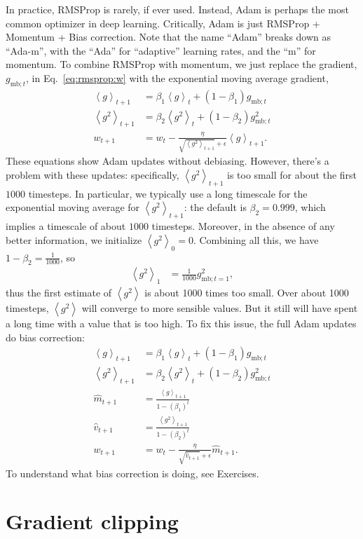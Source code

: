 \documentclass{article}
\newcommand{\bracket}[3]{\left#1 #3 \right#2}
\newcommand{\ab}{\bracket{\langle}{\rangle}}
\newcommand{\0}{\mathbf{0}}
\newcommand{\gsmbt}{g_{\text{mb}; t}}
\newcommand{\vh}{\hat{v}}
\newcommand{\mh}{\hat{m}}
\newcommand{\gssqb}{\ab{g^2}}
\newcommand{\gsb}{\ab{g}}
\begin{document}
In practice, RMSProp is rarely, if ever used.
Instead, Adam is perhaps the most common optimizer in deep learning.
Critically, Adam is just RMSProp + Momentum + Bias correction.
Note that the name ``Adam'' breaks down as ``Ada-m'', with the ``Ada'' for ``adaptive'' learning rates, and the ``m'' for momentum.
To combine RMSProp with momentum, we just replace the gradient, $\gsmbt$, in Eq.~\eqref{eq:rmsprop:w} with the exponential moving average gradient, 
\begin{align}
  \gsb_{t+1} &= \beta_1 \gsb_{t} + (1-\beta_1) \gsmbt\\
  \gssqb_{t+1} &= \beta_2 \gssqb_{t} + (1-\beta_2) \gsmbt^2\\
  w_{t+1} &= w_t - \frac{\eta}{\sqrt{\gssqb_{t+1}} + \epsilon}\gsb_{t+1}.
\end{align}
These equations show Adam updates without debiasing.
However, there's a problem with these updates: specifically, $\gssqb_{t+1}$ is too small for about the first $1000$ timesteps.
In particular, we typically use a long timescale for the exponential moving average for $\gssqb_{t+1}$: the default is $\beta_2 = 0.999$, which implies a timescale of about $1000$ timesteps.
Moreover, in the absence of any better information, we initialize $\gssqb_0 = 0$.
Combining all this, we have $1-\beta_2 = \tfrac{1}{1000}$, so
\begin{align}
  \gssqb_1 &= \tfrac{1}{1000} g_{\text{mb}; t=1}^2,
\end{align}
thus the first estimate of $\gssqb$ is about 1000 times too small.
Over about 1000 timesteps, $\gssqb$ will converge to more sensible values.
But it still will have spent a long time with a value that is too high.
To fix this issue, the full Adam updates do bias correction:
\begin{align}
  \gsb_{t+1} &= \beta_1 \gsb_{t} + (1-\beta_1) \gsmbt\\
  \gssqb_{t+1} &= \beta_2 \gssqb_{t} + (1-\beta_2) \gsmbt^2\\
  \mh_{t+1} &= \frac{\gsb_{t+1}}{1-(\beta_1)^t}\\
  \vh_{t+1} &= \frac{\gssqb_{t+1}}{1-(\beta_2)^t}\\
  w_{t+1} &= w_t - \frac{\eta}{\sqrt{\vh_{t+1}} + \epsilon}\mh_{t+1}.
\end{align}
To understand what bias correction is doing, see Exercises.

\section{Gradient clipping}
\end{document}
